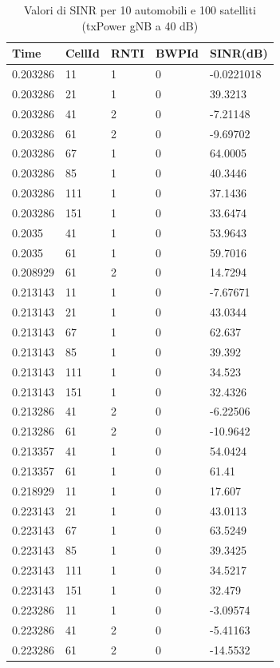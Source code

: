 \documentclass[12pt,a4paper]{article}
\begin{document}
\begin{table}[!ht]
    \centering
    \begin{tabular}{|l|l|l|l|l|}
    \hline
        Time & CellId & RNTI & BWPId & SINR(dB) \\ \hline
        0.203286 & 11 & 1 & 0 & -0.0221018 \\ \hline
        0.203286 & 21 & 1 & 0 & 39.3213 \\ \hline
        0.203286 & 41 & 2 & 0 & -7.21148 \\ \hline
        0.203286 & 61 & 2 & 0 & -9.69702 \\ \hline
        0.203286 & 67 & 1 & 0 & 64.0005 \\ \hline
        0.203286 & 85 & 1 & 0 & 40.3446 \\ \hline
        0.203286 & 111 & 1 & 0 & 37.1436 \\ \hline
        0.203286 & 151 & 1 & 0 & 33.6474 \\ \hline
        0.2035 & 41 & 1 & 0 & 53.9643 \\ \hline
        0.2035 & 61 & 1 & 0 & 59.7016 \\ \hline
        0.208929 & 61 & 2 & 0 & 14.7294 \\ \hline
        0.213143 & 11 & 1 & 0 & -7.67671 \\ \hline
        0.213143 & 21 & 1 & 0 & 43.0344 \\ \hline
        0.213143 & 67 & 1 & 0 & 62.637 \\ \hline
        0.213143 & 85 & 1 & 0 & 39.392 \\ \hline
        0.213143 & 111 & 1 & 0 & 34.523 \\ \hline
        0.213143 & 151 & 1 & 0 & 32.4326 \\ \hline
        0.213286 & 41 & 2 & 0 & -6.22506 \\ \hline
        0.213286 & 61 & 2 & 0 & -10.9642 \\ \hline
        0.213357 & 41 & 1 & 0 & 54.0424 \\ \hline
        0.213357 & 61 & 1 & 0 & 61.41 \\ \hline
        0.218929 & 11 & 1 & 0 & 17.607 \\ \hline
        0.223143 & 21 & 1 & 0 & 43.0113 \\ \hline
        0.223143 & 67 & 1 & 0 & 63.5249 \\ \hline
        0.223143 & 85 & 1 & 0 & 39.3425 \\ \hline
        0.223143 & 111 & 1 & 0 & 34.5217 \\ \hline
        0.223143 & 151 & 1 & 0 & 32.479 \\ \hline
        0.223286 & 11 & 1 & 0 & -3.09574 \\ \hline
        0.223286 & 41 & 2 & 0 & -5.41163 \\ \hline
        0.223286 & 61 & 2 & 0 & -14.5532 \\ \hline
    \end{tabular}
    \caption{Valori di SINR per 10 automobili e 100 satelliti (txPower gNB a 40 dB)}\label{tab:sinr_values_multi_car_one_sat_example}
\end{table}
\end{document}
